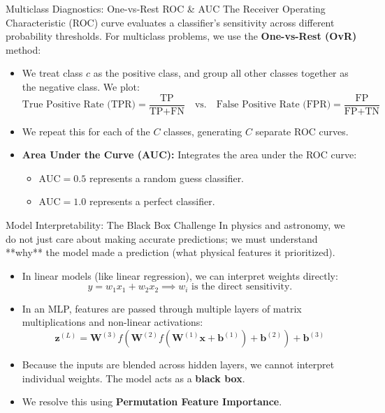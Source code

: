 \documentclass[9pt]{beamer}
\begin{document}
\begin{frame}{Multiclass Diagnostics: One-vs-Rest ROC \& AUC}
  The Receiver Operating Characteristic (ROC) curve evaluates a classifier's sensitivity across different probability thresholds. For multiclass problems, we use the \textbf{One-vs-Rest (OvR)} method:
  \begin{itemize}
    \item We treat class $c$ as the positive class, and group all other classes together as the negative class. We plot:
      $$\text{True Positive Rate (TPR)} = \frac{\text{TP}}{\text{TP} + \text{FN}} \quad \text{vs.} \quad \text{False Positive Rate (FPR)} = \frac{\text{FP}}{\text{FP} + \text{TN}}$$
    \item We repeat this for each of the $C$ classes, generating $C$ separate ROC curves.
    \item \textbf{Area Under the Curve (AUC):} Integrates the area under the ROC curve:
      \begin{itemize}
        \item $\text{AUC} = 0.5$ represents a random guess classifier.
        \item $\text{AUC} = 1.0$ represents a perfect classifier.
      \end{itemize}
  \end{itemize}
\end{frame}

\begin{frame}{Model Interpretability: The Black Box Challenge}
  In physics and astronomy, we do not just care about making accurate predictions; we must understand **why** the model made a prediction (what physical features it prioritized).
  \begin{itemize}
    \item In linear models (like linear regression), we can interpret weights directly:
      $$y = w_1 x_1 + w_2 x_2 \implies w_i \text{ is the direct sensitivity.}$$
    \item In an MLP, features are passed through multiple layers of matrix multiplications and non-linear activations:
      $$\mathbf{z}^{(L)} = \mathbf{W}^{(3)} f \left( \mathbf{W}^{(2)} f \left( \mathbf{W}^{(1)} \mathbf{x} + \mathbf{b}^{(1)} \right) + \mathbf{b}^{(2)} \right) + \mathbf{b}^{(3)}$$
    \item Because the inputs are blended across hidden layers, we cannot interpret individual weights. The model acts as a \textbf{black box}.
    \item We resolve this using \textbf{Permutation Feature Importance}.
  \end{itemize}
\end{frame}
\end{document}
